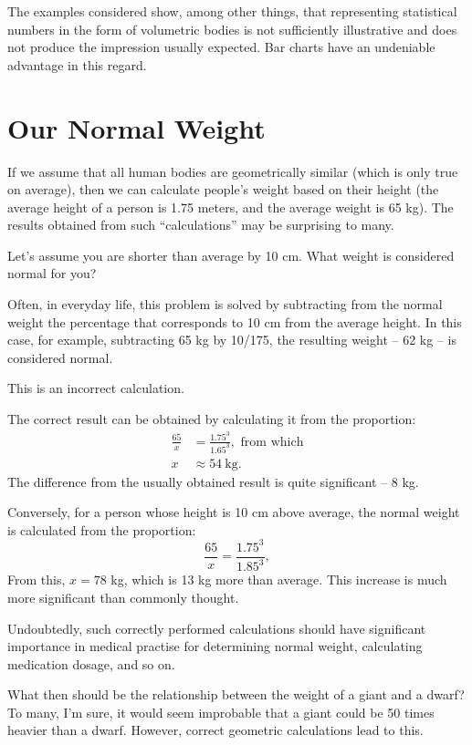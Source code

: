The examples considered show, among other things, that representing statistical numbers in the form of volumetric bodies is not sufficiently illustrative and does not produce the impression usually expected. Bar charts have an undeniable advantage in this regard.

\section{Our Normal Weight}
\label{sec-11.13}

If we assume that all human bodies are geometrically similar (which is only true on average), then we can calculate people's weight based on their height (the average height of a person is 1.75 meters, and the average weight is 65 kg). The results obtained from such ``calculations'' may be surprising to many.

Let's assume you are shorter than average by 10 cm. What weight is considered normal for you?

Often, in everyday life, this problem is solved by subtracting from the normal weight the percentage that corresponds to 10 cm from the average height. In this case, for example, subtracting 65 kg by 10/175, the resulting weight -- 62 kg -- is considered normal.

This is an incorrect calculation.

The correct result can be obtained by calculating it from the proportion:
\begin{align*}%
\frac{65}{x} & = \frac{1.75^{3}}{1.65^{3}}, \,\, \text{from which}\\
 x & \approx \SI{54}{\kilo\gram}.
\end{align*}
The difference from the usually obtained result is quite significant -- 8 kg.

Conversely, for a person whose height is 10 cm above average, the normal weight is calculated from the proportion:
\begin{equation*}%
\frac{65}{x} = \frac{1.75^{3}}{1.85^{3}},
\end{equation*}
From this, \( x = 78 \) kg, which is 13 kg more than average. This increase is much more significant than commonly thought.

Undoubtedly, such correctly performed calculations should have significant importance in medical practise for determining normal weight, calculating medication dosage, and so on.

What then should be the relationship between the weight of a giant and a dwarf? To many, I'm sure, it would seem improbable that a giant could be 50 times heavier than a dwarf. However, correct geometric calculations lead to this.

